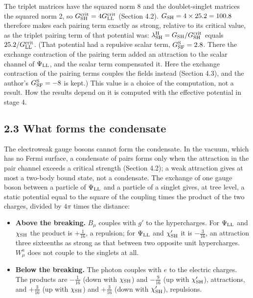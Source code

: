 \documentclass[
  10pt,
]{article}
\providecommand{\tightlist}{%
  \setlength{\itemsep}{0pt}\setlength{\parskip}{0pt}}
\begin{document}
The triplet matrices have the squared norm 8 and the doublet-singlet
matrices the squared norm 2, so
\(G^{\rm crit}_{\rm SH}=4G^{\rm crit}_{\rm LL}\) (Section 4.2).
\(G_{\rm SH}=4\times25.2=100.8\) therefore makes each pairing term
exactly as strong, relative to its critical value, as the triplet
pairing term of that potential was:
\(\lambda^{\rm H}_{\rm SH}=G_{\rm SH}/G^{\rm crit}_{\rm SH}\) equals
\(25.2/G^{\rm crit}_{\rm LL}\). (That potential had a repulsive scalar
term, \(G^{\rm S}_{\rm SF}=2.8\). There the exchange contraction of the
pairing term added an attraction to the scalar channel of
\(\Psi_{\rm LL}\), and the scalar term compensated it. Here the exchange
contraction of the pairing terms couples the fields instead (Section
4.3), and the author's \(G^{\rm S}_{\rm SF}=-8\) is kept.) This value is
a choice of the computation, not a result. How the results depend on it
is computed with the effective potential in stage 4.

\hypertarget{what-forms-the-condensate}{%
\subsection{2.3 What forms the
condensate}\label{what-forms-the-condensate}}

The electroweak gauge bosons cannot form the condensate. In the vacuum,
which has no Fermi surface, a condensate of pairs forms only when the
attraction in the pair channel exceeds a critical strength (Section
4.2); a weak attraction gives at most a two-body bound state, not a
condensate. The exchange of one gauge boson between a particle of
\(\Psi_{\rm LL}\) and a particle of a singlet gives, at tree level, a
static potential equal to the square of the coupling times the product
of the two charges, divided by \(4\pi\) times the distance:

\begin{itemize}
\tightlist
\item
  \textbf{Above the breaking.} \(B_\mu\) couples with \(g'\) to the
  hypercharges. For \(\Psi_{\rm LL}\) and \(\chi_{\rm SH}\) the product
  is \(+\tfrac1{16}\), a repulsion; for \(\Psi_{\rm LL}\) and
  \(\chi'_{\rm SH}\) it is \(-\tfrac3{16}\), an attraction three
  sixteenths as strong as that between two opposite unit hypercharges.
  \(W^a_\mu\) does not couple to the singlets at all.
\item
  \textbf{Below the breaking.} The photon couples with \(e\) to the
  electric charges. The products are \(-\tfrac1{16}\) (down with
  \(\chi_{\rm SH}\)) and \(-\tfrac9{16}\) (up with \(\chi'_{\rm SH}\)),
  attractions, and \(+\tfrac3{16}\) (up with \(\chi_{\rm SH}\)) and
  \(+\tfrac3{16}\) (down with \(\chi'_{\rm SH}\)), repulsions.
\end{itemize}
\end{document}
